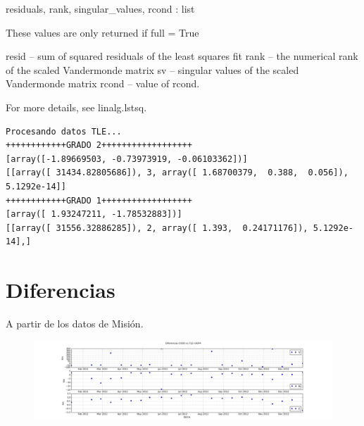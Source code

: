 residuals, rank, singular\_values, rcond : list

    These values are only returned if full = True

    resid – sum of squared residuals of the least squares fit rank – the numerical rank of the scaled Vandermonde matrix sv – singular values of the scaled Vandermonde matrix rcond – value of rcond.

    For more details, see linalg.lstsq.

\begin{verbatim}
Procesando datos TLE...
++++++++++++GRADO 2++++++++++++++++++
[array([-1.89669503, -0.73973919, -0.06103362])]
[[array([ 31434.82805686]), 3, array([ 1.68700379,  0.388,  0.056]), 5.1292e-14]]
++++++++++++GRADO 1++++++++++++++++++
[array([ 1.93247211, -1.78532883])]
[[array([ 31556.32886285]), 2, array([ 1.393,  0.24171176]), 5.1292e-14],]
\end{verbatim}

% 


\section*{Diferencias}
A partir de los datos de Misión. 

\begin{figure}[!h]
  \centering
  \includegraphics[width=\textwidth]{imagenes/sesgoTLE}
\end{figure}

